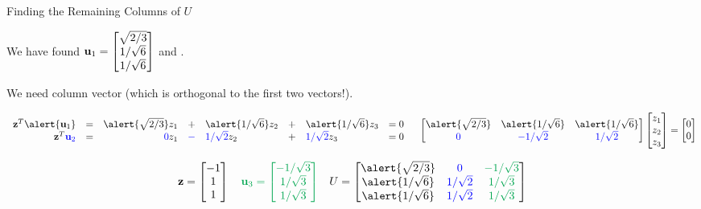 \documentclass[xcolor=dvipsnames,aspectratio=169,t]{beamer}
\begin{document}
\begin{frame}{Finding the Remaining Columns of $U$}
  \smallskip

  We have found \alert{$\mathbf{u}_1 = \begin{bmatrix} \sqrt{2/3} \\ 1/\sqrt{6} \\  1/\sqrt{6}  \end{bmatrix}$} and
  .
  \smallskip

  We need  column vector (which is \alert{orthogonal} to the first two vectors!).
  \vspace*{-1.5em}

  \pause
  \[ \begin{array}{rcrclcll}
  \z^T \alert{\u_1} &=&  \alert{\sqrt{2/3}}z_1 &+& \alert{1/\sqrt{6}}z_2 &+& \alert{1/\sqrt{6}}z_3&=0 \\
  \z^T \colorb{\u_2} &=&  \colorb{0}z_1 & \colorb{-} & \colorb{1/\sqrt{2}}z_2 &+&  \colorb{1/\sqrt{2} } z_3&=0
  \end{array}
  \quad
  \begin{bmatrix}  \alert{\sqrt{2/3}} & \alert{1/\sqrt{6}} &\alert{1/\sqrt{6}} \\ \colorb{0} & \colorb{-1/\sqrt{2}} &  \colorb{1/\sqrt{2} } \end{bmatrix} \begin{bmatrix} z_1 \\ z_2 \\ z_3 \end{bmatrix} = \begin{bmatrix} 0 \\ 0 \end{bmatrix} \]

  \[ \z = \begin{bmatrix} -1 \\ 1 \\ 1 \end{bmatrix} 
  \quad \colorg{\u_3 = \begin{bmatrix} -1/\sqrt{3} \\ 1/\sqrt{3} \\ 1/\sqrt{3} \end{bmatrix}} 
  \quad U = \begin{bmatrix} \alert{\sqrt{2/3}}  &  \colorb{0} & \colorg{ -1/\sqrt{3}}\\ \alert{1/\sqrt{6}} & \colorb{1/\sqrt{2}} &  \colorg{1/\sqrt{3}}\\  \alert{1/\sqrt{6}} & \colorb{1/\sqrt{2}} &  \colorg{1/\sqrt{3}}\end{bmatrix} \]
\end{frame}
\end{document}
